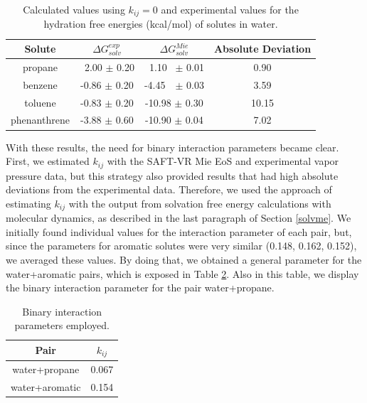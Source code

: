 \begin{table}[h]
	\centering
	\caption{Calculated values using $k_{ij}=0$ and experimental values for the hydration free energies (kcal/mol) of solutes in water.}
	\label{tbl:solv3}
	\begin{tabular}{cccc}
		\hline\hline
		Solute       & $\Delta G_{solv}^{exp}$ & $\Delta G_{solv}^{Mie}$ & Absolute Deviation \\ \hline\hline
		propane      & $\,$ 2.00 $\pm$ 0.20         & $\,$ 1.10 $\,$ $\pm$ 0.01         & 0.90               \\
		benzene      & -0.86 $\pm$ 0.20        & -4.45 $\, \,$ $\pm$ 0.03        & 3.59               \\
		toluene      & -0.83 $\pm$ 0.20        & -10.98 $\pm$ 0.30       & 10.15              \\
		phenanthrene & -3.88 $\pm$ 0.60        & -10.90 $\pm$ 0.04       & 7.02               \\ \hline\hline
	\end{tabular}
\end{table}
\FloatBarrier

With these results, the need for binary interaction parameters became clear. First, we estimated $k_{ij}$ with the SAFT-VR Mie EoS and experimental vapor pressure data, but this strategy also provided results that had high absolute deviations from the experimental data. Therefore, we used the approach of estimating $k_{ij}$ with the output from solvation free energy calculations with molecular dynamics, as described in the last paragraph of Section \ref{solvme}.  We initially found individual values for the interaction parameter of each pair, but, since the parameters for aromatic solutes were very similar (0.148, 0.162, 0.152), we averaged these values. By doing that,  we obtained a general parameter for the water+aromatic pairs, which is exposed in Table \ref{tbl:kij}. Also in this table, we display the binary interaction parameter for the pair water+propane. 

\begin{table}[h]
	\centering
	\caption{Binary interaction parameters employed.}
	\label{tbl:kij}
	\begin{tabular}{cc}
		\hline
		\hline
		Pair & $k_{ij}$ \\
		\hline\hline
		water+propane      & 0.067  \\
		water+aromatic      & 0.154 \\  
		\hline
		\hline
	\end{tabular}
\end{table}

